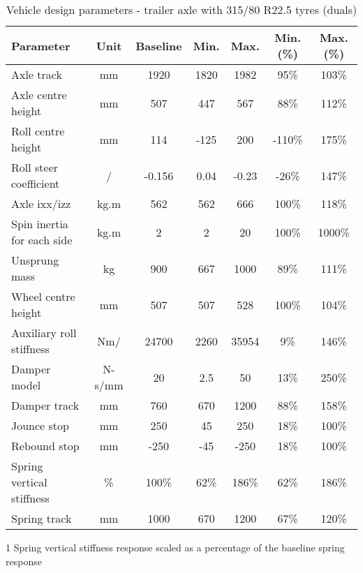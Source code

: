 \begin{table}[H]
	\centering\footnotesize
	\begin{threeparttable}

		\begin{tabulary}{\textwidth}{lcccccc}
			\toprule
			\textbf{Parameter} & \textbf{Unit} & \textbf{Baseline} & \textbf{Min.} & \textbf{Max.} & \textbf{Min. (\%)} & \textbf{Max. (\%)} \\

			\midrule
			Axle track & mm    & 1920  & 1820  & 1982  & 95\%  & 103\% \\
			Axle centre height & mm    & 507   & 447   & 567   & 88\%  & 112\% \\
			Roll centre height & mm    & 114   & -125  & 200   & -110\% & 175\% \\
			Roll steer coefficient & \degree{}/\degree{} & -0.156 & 0.04  & -0.23 & -26\% & 147\% \\
			Axle \gls{ixx}/\gls{izz}  & kg.m\sstw{} & 562   & 562   & 666   & 100\% & 118\% \\
			Spin inertia for each side & kg.m\sstw{} & 2     & 2     & 20    & 100\% & 1000\% \\
			Unsprung mass  & kg    & 900   & 667   & 1000  & 89\%  & 111\% \\
			Wheel centre height & mm    & 507   & 507   & 528   & 100\% & 104\% \\
			Auxiliary roll stiffness  & Nm/\degree{} & 24700 & 2260  & 35954 & 9\%   & 146\% \\
			Damper model & N-s/mm & 20    & 2.5   & 50    & 13\%  & 250\% \\
			Damper track & mm    & 760   & 670   & 1200  & 88\%  & 158\% \\
			Jounce stop & mm    & 250   & 45    & 250   & 18\%  & 100\% \\
			Rebound stop & mm    & -250  & -45   & -250  & 18\%  & 100\% \\
			Spring vertical stiffness & \%  & 100\% & 62\%  & 186\% & 62\%  & 186\% \\
			Spring track & mm    & 1000  & 670   & 1200  & 67\%  & 120\% \\

			\bottomrule
		\end{tabulary}

		\caption{Vehicle design parameters - trailer axle with 315/80 R22.5 tyres (duals)}
		\label{table:vdp-range-axle-trailer-315}

		\begin{tablenotes}
			\item[1] Spring vertical stiffness response scaled as a percentage of the baseline spring response
		\end{tablenotes}

	\end{threeparttable}
\end{table}

